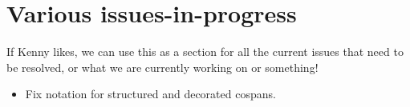 \documentclass{amsart}
\begin{document}
\begin{comment}
\begin{center}   
  \vspace{0.3cm}
  {\em John\ C.\ Baez \\}
  \vspace{0.3cm}
  {\small
 Department of Mathematics \\
    University of California \\
  Riverside CA, USA 92521 \\ and \\
 Centre for Quantum Technologies  \\
  National University of Singapore \\
    Singapore 117543  \\    } 
 \vspace{0.4cm}
{\em Kenny Courser \\}
\vspace{0.3cm}
   {\small
  Department of Mathematics \\
  University of California \\
  Riverside CA, USA 92521 \\}
  \vspace{0.4cm}   
{\em Christina Vasilakopoulou \\}
\vspace{0.3cm}
   {\small
  Department of Mathematics \\
  University of California \\
  Riverside CA, USA 92521 \\}
  \vspace{0.3cm}   
  {\small email: baez@math.ucr.edu, courser@math.ucr.edu, vasilak@ucr.edu\\} 
  \vspace{0.3cm}   
  {\small \today}
  \vspace{0.3cm}   
\end{center}   
\end{comment}

\tableofcontents

\section*{Various issues-in-progress}
{\chris If Kenny likes, we can use this as a section for all the current issues that need to be resolved, or what we are currently working on or something!}
\begin{itemize}
\item Fix notation for structured and decorated cospans.
\end{itemize}
\end{document}
